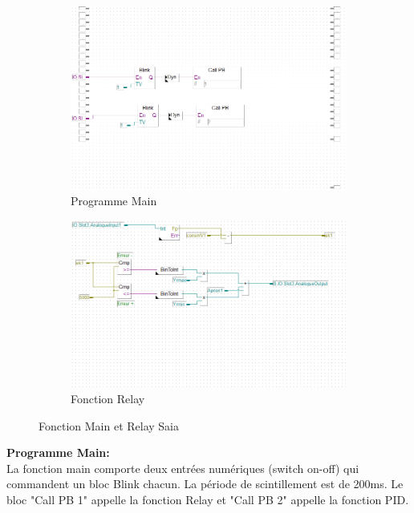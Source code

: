 \begin{figure}[h!]
	\begin{subfigure}{0.5\linewidth}
		\centering
		\includegraphics[width=\linewidth]{img/SAIA_MAIN}
		\caption{Programme Main}
		\label{fig:Programme Main}
	\end{subfigure}
	\begin{subfigure}{0.5\linewidth}
		\centering
		\includegraphics[width=\linewidth]{img/relay}
		\caption{Fonction Relay}
		\label{fig:Fonction Relay}
	\end{subfigure}
\caption{Fonction Main et Relay Saia}
\end{figure}

\textbf{Programme Main:}\\
La fonction main comporte deux entrées numériques (switch on-off) qui commandent un bloc Blink chacun. La période de scintillement est de 200ms. Le bloc "Call PB 1" appelle la fonction Relay et "Call PB 2" appelle la fonction PID.\\

